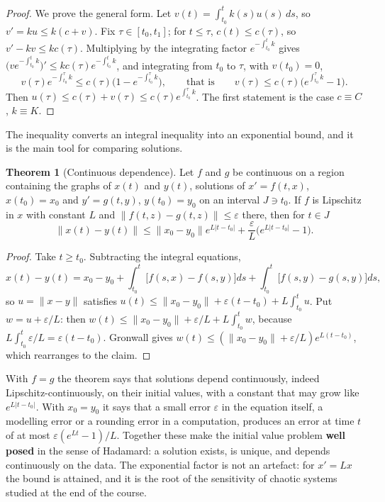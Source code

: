 \documentclass[11pt,a4paper]{article}
\numberwithin{equation}{section}
\theoremstyle{definition}
\newtheorem{thm}{Theorem}[subsection]
\begin{document}
\begin{proof}
We prove the general form. Let $v(t) = \int_{t_0}^tk(s)u(s)\,ds$, so $v' = ku \leq k(c + v)$. Fix $\tau \in [t_0, t_1]$; for $t \leq \tau$, $c(t) \leq c(\tau)$, so $v' - kv \leq kc(\tau)$. Multiplying by the integrating factor
$e^{-\int_{t_0}^tk}$ gives $\bigl(v e^{-\int_{t_0}^tk}\bigr)' \leq kc(\tau)e^{-\int_{t_0}^tk}$, and integrating from $t_0$ to $\tau$, with $v(t_0) = 0$,
\[
v(\tau)e^{-\int_{t_0}^\tau k} \leq c(\tau)\bigl(1 - e^{-\int_{t_0}^\tau k}\bigr), \qquad\text{that is}\qquad v(\tau) \leq c(\tau)\bigl(e^{\int_{t_0}^\tau k} - 1\bigr) .
\]
Then $u(\tau) \leq c(\tau) + v(\tau) \leq c(\tau)e^{\int_{t_0}^\tau k}$. The first statement is the case $c \equiv C$, $k \equiv K$.
\end{proof}

The inequality converts an integral inequality into an exponential bound, and it is the main tool for comparing solutions.

\begin{thm}[Continuous dependence]
\label{thm:contdep}
Let $f$ and $g$ be continuous on a region containing the graphs of $x(t)$ and $y(t)$, solutions of $x' = f(t, x)$, $x(t_0) = x_0$ and $y' = g(t, y)$, $y(t_0) = y_0$ on an interval $J \ni t_0$. If $f$ is
Lipschitz in $x$ with constant $L$ and $\|f(t, z) - g(t, z)\| \leq \varepsilon$ there, then for $t \in J$
\[
\|x(t) - y(t)\| \leq \|x_0 - y_0\|e^{L|t - t_0|} + \frac\varepsilon L\bigl(e^{L|t - t_0|} - 1\bigr) .
\]
\end{thm}

\begin{proof}
Take $t \geq t_0$. Subtracting the integral equations,
\[
x(t) - y(t) = x_0 - y_0 + \int_{t_0}^t\bigl[f(s, x) - f(s, y)\bigr]ds + \int_{t_0}^t\bigl[f(s, y) - g(s, y)\bigr]ds ,
\]
so $u = \|x - y\|$ satisfies $u(t) \leq \|x_0 - y_0\| + \varepsilon(t - t_0) + L\int_{t_0}^tu$. Put $w = u + \varepsilon/L$: then $w(t) \leq \|x_0 - y_0\| + \varepsilon/L + L\int_{t_0}^tw$, because $L\int_{t_0}^t\varepsilon/L = \varepsilon(t - t_0)$.
Gronwall gives $w(t) \leq (\|x_0 - y_0\| + \varepsilon/L)e^{L(t - t_0)}$, which rearranges to the claim.
\end{proof}

With $f = g$ the theorem says that solutions depend continuously, indeed Lipschitz-continuously, on their initial values, with a constant that may grow
like $e^{L|t - t_0|}$. With $x_0 = y_0$ it says that a small error $\varepsilon$ in the equation itself, a modelling error or a rounding error in a computation, produces an error at
time $t$ of at most $\varepsilon(e^{Lt} - 1)/L$. Together these make the initial value problem \textbf{well posed} in the sense of Hadamard: a solution exists, is unique, and
depends continuously on the data. The exponential factor is not an artefact: for $x' = Lx$ the bound is attained, and it is the root of the sensitivity of chaotic
systems studied at the end of the course.
\end{document}
